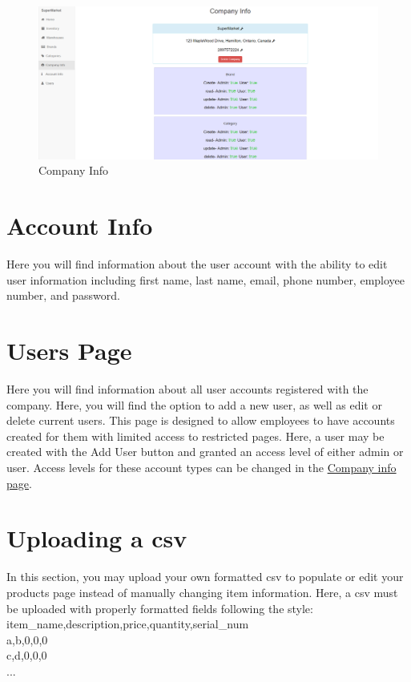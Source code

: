 \documentclass[12pt, titlepage]{article}
\begin{document}
\begin{figure}[h]
\centering
\includegraphics[width=\linewidth]{sims7.PNG}
\caption{Company Info}
\label{fig:figure4}
\end{figure}

\section{Account Info}
\label{sec:info}
Here you will find information about the user account with the ability to edit user information including first name, last name, email, phone number, employee number, and password.

\section{Users Page}
\label{sec:info}
Here you will find information about all user accounts registered with the company. Here, you will find the option to add a new user, as well as edit or delete current users. This page is designed to allow employees to have accounts created for them with limited access to restricted pages. Here, a user may be created with the Add User button and granted an access level of either admin or user. Access levels for these account types can be changed in the \hyperref[sec:companyinfo]{Company info page}.

\section{Uploading a csv}
\label{sec:csv}
In this section, you may upload your own formatted csv to populate or edit your products page instead of manually changing item information. Here, a csv must be uploaded with properly formatted fields following the style:
item\_name,description,price,quantity,serial\_num\\
a,b,0,0,0\\
c,d,0,0,0\\
...\\
\end{document}
